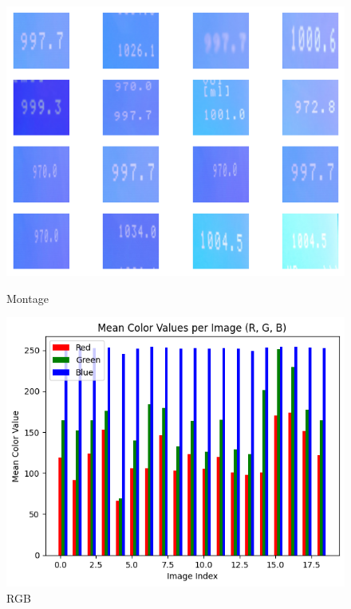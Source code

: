 \begin{figure}[ht]
    \centering
    \begin{minipage}[t]{0.25\textwidth}
        \centering
        \includegraphics[width=\textwidth]{Figures/EDA_Charts/9/montage.png}
        \caption*{Montage}
    \end{minipage}\hfill
    \begin{minipage}[t]{0.25\textwidth}
        \centering
        \includegraphics[width=\textwidth]{Figures/EDA_Charts/9/rgb.png}
        \caption*{RGB}
    \end{minipage}\hfill
    \begin{minipage}[t]{0.50\textwidth}

\end{minipage}
\end{figure}
